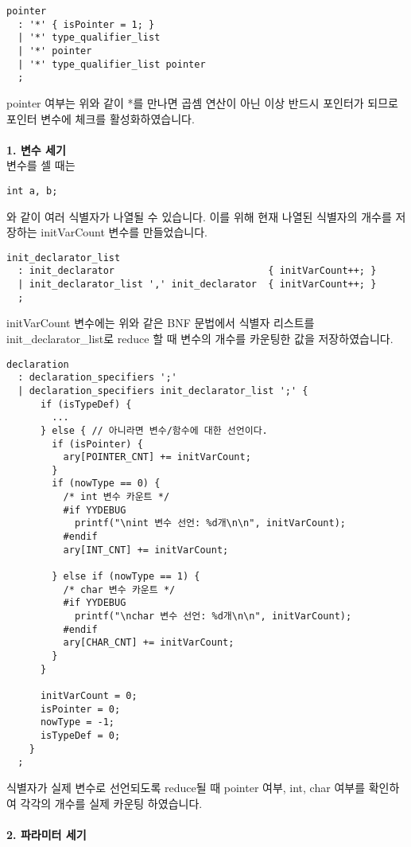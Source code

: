 \documentclass{article}
\begin{document}
\begin{verbatim}
pointer
  : '*' { isPointer = 1; }
  | '*' type_qualifier_list
  | '*' pointer
  | '*' type_qualifier_list pointer
  ;
\end{verbatim}
pointer 여부는 위와 같이 *를 만나면 곱셈 연산이 아닌 이상 반드시 포인터가 되므로 포인터 변수에 체크를 활성화하였습니다.\\\\
\textbf{1. 변수 세기}\\
\quad 변수를 셀 때는
\begin{verbatim}int a, b; \end{verbatim}
와 같이 여러 식별자가 나열될 수 있습니다. 이를 위해 현재 나열된 식별자의 개수를 저장하는 initVarCount 변수를 만들었습니다.
\begin{verbatim}
init_declarator_list
  : init_declarator                           { initVarCount++; }
  | init_declarator_list ',' init_declarator  { initVarCount++; }
  ;
\end{verbatim}
initVarCount 변수에는 위와 같은 BNF 문법에서 식별자 리스트를 init\_declarator\_list로 reduce 할 때 변수의 개수를 카운팅한 값을 저장하였습니다.
\begin{verbatim}
declaration
  : declaration_specifiers ';'
  | declaration_specifiers init_declarator_list ';' {
      if (isTypeDef) {
        ...
      } else { // 아니라면 변수/함수에 대한 선언이다.
        if (isPointer) {
          ary[POINTER_CNT] += initVarCount;
        }
        if (nowType == 0) {
          /* int 변수 카운트 */
          #if YYDEBUG
            printf("\nint 변수 선언: %d개\n\n", initVarCount);
          #endif
          ary[INT_CNT] += initVarCount;

        } else if (nowType == 1) {
          /* char 변수 카운트 */
          #if YYDEBUG
            printf("\nchar 변수 선언: %d개\n\n", initVarCount);
          #endif
          ary[CHAR_CNT] += initVarCount;
        }
      }

      initVarCount = 0;
      isPointer = 0;
      nowType = -1;
      isTypeDef = 0;
    }
  ;
\end{verbatim}
식별자가 실제 변수로 선언되도록 reduce될 때 pointer 여부, int, char 여부를 확인하여 각각의 개수를 실제 카운팅 하였습니다.\\\\
\textbf{2. 파라미터 세기}\\
\end{document}
